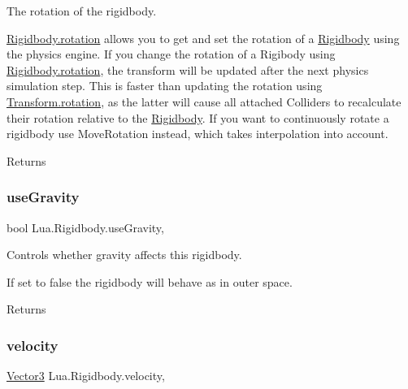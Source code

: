 The rotation of the rigidbody. 

\mbox{\hyperlink{class_lua_1_1_rigidbody_a6cb1207363fce98ec04cacf8c6f776cc}{Rigidbody.\+rotation}} allows you to get and set the rotation of a \mbox{\hyperlink{class_lua_1_1_rigidbody}{Rigidbody}} using the physics engine. If you change the rotation of a Rigibody using \mbox{\hyperlink{class_lua_1_1_rigidbody_a6cb1207363fce98ec04cacf8c6f776cc}{Rigidbody.\+rotation}}, the transform will be updated after the next physics simulation step. This is faster than updating the rotation using \mbox{\hyperlink{class_lua_1_1_transform_ab0b5488416c3d0f6e3de7b426227198c}{Transform.\+rotation}}, as the latter will cause all attached Colliders to recalculate their rotation relative to the \mbox{\hyperlink{class_lua_1_1_rigidbody}{Rigidbody}}. If you want to continuously rotate a rigidbody use Move\+Rotation instead, which takes interpolation into account. \begin{DoxyReturn}{Returns}

\end{DoxyReturn}
\mbox{\label{class_lua_1_1_rigidbody_a3838f1418140279bcec4d7a2f8ebbae2}} 
\subsubsection{\texorpdfstring{useGravity}{useGravity}}
{\footnotesize\ttfamily bool Lua.\+Rigidbody.\+use\+Gravity\hspace{0.3cm}{\ttfamily [get]}, {\ttfamily [set]}}



Controls whether gravity affects this rigidbody. 

If set to false the rigidbody will behave as in outer space. \begin{DoxyReturn}{Returns}

\end{DoxyReturn}
\mbox{\label{class_lua_1_1_rigidbody_abbc468f41391b7d34120f11f3f39b6fb}} 
\subsubsection{\texorpdfstring{velocity}{velocity}}
{\footnotesize\ttfamily \mbox{\hyperlink{class_lua_1_1_vector3}{Vector3}} Lua.\+Rigidbody.\+velocity\hspace{0.3cm}{\ttfamily [get]}, {\ttfamily [set]}}



